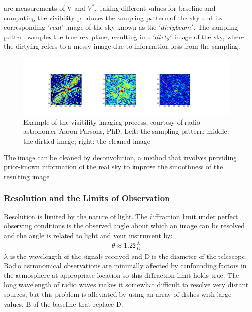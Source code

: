 \documentclass{article}
\begin{document}
are measurements of V and $V^{\ast}$. Taking different values for
baseline and computing the visibility produces the sampling pattern of
the sky and its corresponding $'real'$ image of the sky known as the
$'dirty beam'$. The sampling pattern samples the true u-v plane,
resulting in a $'dirty'$ image of the sky, where the dirtying refers to
a messy image due to information loss from the sampling. 
\begin{figure}[!h]
\centering
\includegraphics[width=\textwidth]{visibility.png}
\caption{Example of the visibility imaging process, courtesy of radio
  astronomer Aaron Parsons, PhD. Left: the sampling
  pattern; middle: the dirtied image; right: the cleaned image}
\end{figure}
The image can be cleaned by
deconvolution, a method that involves providing prior-known information
of the real sky to improve the smoothness of the resulting image.
\subsubsection{Resolution and the Limits of Observation}
Resolution is limited by the nature of light. The diffraction limit
under perfect observing conditions is the observed angle about which an
image can be resolved and the angle is related to light and your
instrument by: 
\begin{align}\theta \approx 1.22\frac{\lambda}{D}
\end{align}
$\lambda$ is the wavelength of the signals received and D is the
diameter of the telescope. Radio astronomical observations are minimally
affected by confounding factors in the atmosphere at appropriate
location so this diffraction limit holds true. The long wavelength of 
radio waves makes it somewhat difficult to resolve very distant sources,
but this problem is alleviated by using an array of dishes with large
values, B of the baseline that replace D.
\end{document}

